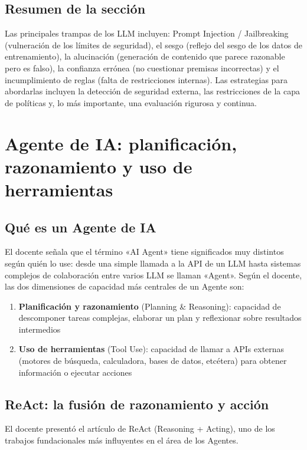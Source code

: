 \documentclass[a4paper]{article}
\begin{document}
\subsection{Resumen de la sección}

Las principales trampas de los LLM incluyen: Prompt Injection / Jailbreaking (vulneración de los límites de seguridad), el sesgo (reflejo del sesgo de los datos de entrenamiento), la alucinación (generación de contenido que parece razonable pero es falso), la confianza errónea (no cuestionar premisas incorrectas) y el incumplimiento de reglas (falta de restricciones internas). Las estrategias para abordarlas incluyen la detección de seguridad externa, las restricciones de la capa de políticas y, lo más importante, una evaluación rigurosa y continua.

\section{Agente de IA: planificación, razonamiento y uso de herramientas}

\subsection{Qué es un Agente de IA}

El docente señala que el término «AI Agent» tiene significados muy distintos según quién lo use: desde una simple llamada a la API de un LLM hasta sistemas complejos de colaboración entre varios LLM se llaman «Agent». Según el docente, las dos dimensiones de capacidad más centrales de un Agente son:

\begin{enumerate}
    \item \textbf{Planificación y razonamiento} (Planning \& Reasoning): capacidad de descomponer tareas complejas, elaborar un plan y reflexionar sobre resultados intermedios
    \item \textbf{Uso de herramientas} (Tool Use): capacidad de llamar a APIs externas (motores de búsqueda, calculadora, bases de datos, etcétera) para obtener información o ejecutar acciones
\end{enumerate}

\subsection{ReAct: la fusión de razonamiento y acción}

El docente presentó el artículo de ReAct (Reasoning + Acting), uno de los trabajos fundacionales más influyentes en el área de los Agentes.
\end{document}

